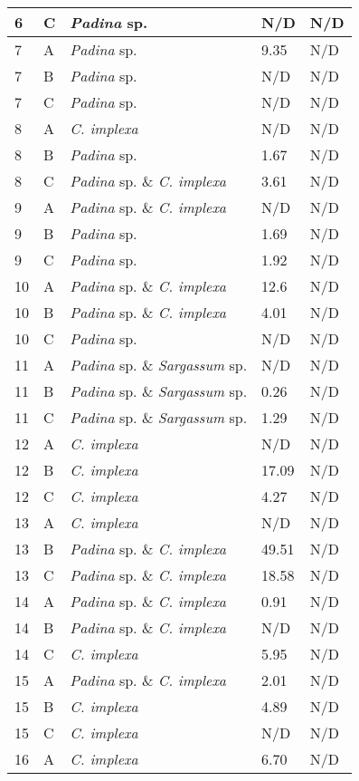\documentclass[12pt]{article}
\begin{document}
\begin{longtable}{ | p{1cm} | p{1cm} | p{3cm} | p{4cm} | p{4cm} | }
\hline
6&C&\emph{Padina} sp.&N/D&N/D\\
\hline
7&A&\emph{Padina} sp.&9.35
&N/D\\
\hline
7&B&\emph{Padina} sp.&N/D&N/D\\
\hline
7&C&\emph{Padina} sp.&N/D&N/D\\
\hline
8&A&\emph{C. implexa}&N/D&N/D\\
\hline
8&B&\emph{Padina} sp.&1.67
&N/D\\
\hline
8&C&\emph{Padina} sp. \& \emph{C. implexa}&3.61
&N/D\\
\hline
9&A&\emph{Padina} sp. \& \emph{C. implexa}&N/D&N/D\\
\hline
9&B&\emph{Padina} sp.&1.69
&N/D\\
\hline
9&C&\emph{Padina} sp.&1.92
&N/D\\
\hline
10&A&\emph{Padina} sp. \& \emph{C. implexa}&12.6
&N/D\\
\hline
10&B&\emph{Padina} sp. \& \emph{C. implexa}&4.01
&N/D\\
\hline
10&C&\emph{Padina} sp.&N/D&N/D\\
\hline
11&A&\emph{Padina} sp. \& \emph{Sargassum} sp.&N/D&N/D\\
\hline
11&B&\emph{Padina} sp. \& \emph{Sargassum} sp.&0.26
&N/D\\
\hline
11&C&\emph{Padina} sp. \& \emph{Sargassum} sp.&1.29
&N/D\\
\hline
12&A&\emph{C. implexa}&N/D&N/D\\
\hline
12&B&\emph{C. implexa}&17.09
&N/D\\
\hline
12&C&\emph{C. implexa}&4.27
&N/D\\
\hline
13&A&\emph{C. implexa}&N/D&N/D\\
\hline
13&B&\emph{Padina} sp. \& \emph{C. implexa}&49.51
&N/D\\
\hline
13&C&\emph{Padina} sp. \& \emph{C. implexa}&18.58
&N/D\\
\hline
14&A&\emph{Padina} sp. \& \emph{C. implexa}&0.91
&N/D\\
\hline
14&B&\emph{Padina} sp. \& \emph{C. implexa}&N/D&N/D\\
\hline
14&C&\emph{C. implexa}&5.95
&N/D\\
\hline
15&A&\emph{Padina} sp. \& \emph{C. implexa}&2.01
&N/D\\
\hline
15&B&\emph{C. implexa}&4.89
&N/D\\
\hline
15&C&\emph{C. implexa}&N/D&N/D\\
\hline
16&A&\emph{C. implexa}&6.70&N/D\\

\end{longtable}
\end{document}

